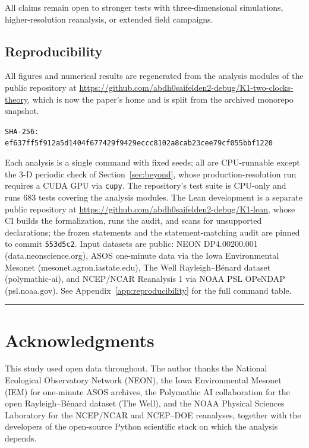\documentclass[11pt]{article}
\begin{document}
All claims remain open to stronger tests with three-dimensional simulations, higher-resolution reanalysis, or extended field campaigns.

\subsection{Reproducibility}

All figures and numerical results are regenerated from the analysis modules of the public repository at
\url{https://github.com/abdh0saifelden2-debug/K1-two-clocks-theory}, which is now the paper's home and is split from the archived monorepo snapshot.
\par\smallskip
\noindent\texttt{\footnotesize SHA-256: ef637ff5f912a5d1404f677429f9429eccc8102a8cab23cee79cf055bbf1220}
\par\smallskip
Each analysis is a single command with fixed seeds; all are CPU-runnable except the 3-D periodic check of Section~\ref{sec:beyond}, whose production-resolution run requires a CUDA GPU via \texttt{cupy}. The repository's test suite is CPU-only and runs 683 tests covering the analysis modules. The Lean development is a separate public repository at
\url{https://github.com/abdh0saifelden2-debug/K1-lean}, whose CI builds the formalization, runs the audit, and scans for unsupported declarations; the frozen statements and the statement-matching audit are pinned to commit \texttt{553d5c2}. Input datasets are public: NEON DP4.00200.001 (data.\allowbreak neonscience.org), ASOS one-minute data via the Iowa Environmental Mesonet (mesonet.\allowbreak agron.\allowbreak iastate.edu), The Well Rayleigh--B\'enard dataset (polymathic-ai), and NCEP/NCAR Reanalysis 1 via NOAA PSL OPeNDAP (psl.\allowbreak noaa.gov). See Appendix~\ref{app:reproducibility} for the full command table.

\medskip\hrule\medskip

\section*{Acknowledgments}

This study used open data throughout. The author thanks the National Ecological Observatory Network (NEON), the Iowa Environmental Mesonet (IEM) for one-minute ASOS archives, the Polymathic AI collaboration for the open Rayleigh--B\'enard dataset (The Well), and the NOAA Physical Sciences Laboratory for the NCEP/NCAR and NCEP--DOE reanalyses, together with the developers of the open-source Python scientific stack on which the analysis depends.
\end{document}
